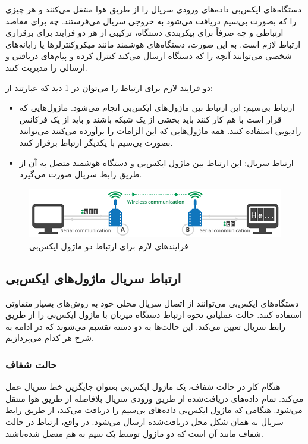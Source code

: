 دستگاه‌های ایکس‌بی داده‌های ورودی سریال را از طریق هوا منتقل می‌کنند و هر چیزی را که بصورت بی‌سیم دریافت می‌شود به خروجی سریال می‌فرستند. چه برای مقاصد ارتباطی و چه صرفاً برای پیکربندی دستگاه، ترکیبی از هر دو فرایند برای برقراری ارتباط لازم است. به این صورت، دستگاه‌های هوشمند مانند میکروکنترلرها یا رایانه‌های شخصی می‌توانند آنچه را که دستگاه ارسال می‌کند کنترل کرده و پیام‌های دریافتی و ارسالی را مدیریت کنند\cite{Digi}.

دو فرایند لازم برای ارتباط را می‌توان در \cref{fig:xbee_communication} \cite{Digi} دید که عبارتند از:
\begin{itemize}
\item ارتباط بی‌سیم: این ارتباط بین ماژول‌های ایکس‌بی انجام می‌شود. ماژول‌هایی که قرار است با هم کار کنند باید بخشی از یک شبکه باشند و باید از یک فرکانس رادیویی استفاده کنند. همه ماژول‌هایی که این الزامات را برآورده می‌کنند می‌توانند بصورت بی‌سیم با یکدیگر ارتباط برقرار کنند.
\item ارتباط سریال: این ارتباط بین ماژول ایکس‌بی و دستگاه هوشمند متصل به آن از طریق رابط سریال صورت می‌گیرد.
\end{itemize}

\begin{figure}[!h]
\centering\includegraphics[scale=.7]{xbee_communication.png}
\caption{فرایندهای لازم برای ارتباط دو ماژول ایکس‌بی \cite{Digi}}\label{fig:xbee_communication}
\end{figure}

\subsection{ارتباط سریال ماژول‌های ایکس‌بی}

دستگاه‌های ایکس‌بی می‌توانند از اتصال سریال محلی خود به روش‌های بسیار متفاوتی استفاده کنند. حالت عملیاتی نحوه ارتباط دستگاه میزبان با ماژول ایکس‌بی را از طریق رابط سریال تعیین می‌کند. این حالت‌ها به دو دسته تقسیم می‌شوند که در ادامه به شرح هر کدام می‌پردازیم.

\subsubsection{حالت شفاف}

هنگام کار در حالت شفاف، یک ماژول ایکس‌بی بعنوان جایگزین خط سریال عمل می‌کند. تمام داده‌های دریافت‌شده از طریق ورودی سریال بلافاصله از طریق هوا منتقل می‌شود. هنگامی که ماژول ایکس‌بی داده‌های بی‌سیم را دریافت می‌کند، از طریق رابط سریال به همان شکل محل دریافت‌شده ارسال می‌شود. در واقع، ارتباط در حالت شفاف مانند آن است که دو ماژول توسط یک سیم به هم متصل شده‌باشند\cite{Digi}.


